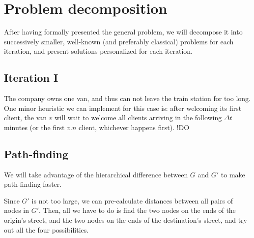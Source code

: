\chapter{Problem decomposition}
After having formally presented the general problem, we will decompose it into successively smaller, well-known (and preferably classical) problems for each iteration, and present solutions personalized for each iteration.
\section{Iteration I}
The company owns one van, and thus can not leave the train station for too long. One minor heuristic we can implement for this case is: after welcoming its first client, the van $v$ will wait to welcome all clients arriving in the following $\Delta t$ minutes (or the first $v.n$ client, whichever happens first). !DO 
\section{Path-finding}
We will take advantage of the hierarchical difference between $G$ and $G'$ to make path-finding faster.\par
Since $G'$ is not too large, we can pre-calculate distances between all pairs of nodes in $G'$.
Then, all we have to do is find the two nodes on the ends of the origin's street, and the two nodes on the ends of the destination's street, and try out all the four possibilities.
